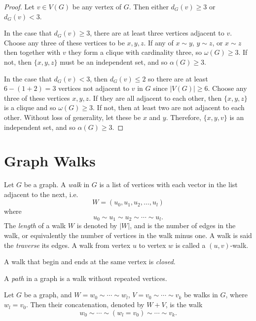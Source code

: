\begin{proof}
    Let $v \in V(G)$ be any vertex of $G$. Then either $d_G(v) \geq 3$ or $d_G(v) < 3$.

    In the case that $d_G(v) \geq 3$, there are at least three vertices adjacent to $v$. Choose any three of these vertices to be $x, y, z$. If any of $x \sim y$, $y \sim z$, or $x \sim z$ then together with $v$ they form a clique with cardinality three, so $\omega(G) \geq 3$. If not, then $\{x, y, z\}$ must be an independent set, and so $\alpha(G) \geq 3$.

    In the case that $d_G(v) < 3$, then $d_G(v) \leq 2$ so there are at least $6 - (1 + 2) = 3$ vertices not adjacent to $v$ in $G$ since $|V(G)| \geq 6$. Choose any three of these vertices $x, y, z$. If they are all adjacent to each other, then $\{x, y, z\}$ is a clique and so $\omega(G) \geq 3$. If not, then at least two are not adjacent to each other. Without loss of generality, let these be $x$ and $y$. Therefore, $\{x, y, v\}$ is an independent set, and so $\alpha(G) \geq 3$.
\end{proof}

\section{Graph Walks}

\begin{defn}
    Let $G$ be a graph. A \emph{walk} in $G$ is a list of vertices with each vector in the list adjacent to the next, i.e. \[W = (u_0, u_1, u_2, \ldots, u_l)\] where \[u_0 \sim u_1 \sim u_2 \sim \cdots \sim u_l.\] The \emph{length} of a walk $W$ is denoted by $|W|$, and is the number of edges in the walk, or equivalently the number of vertices in the walk minus one. A walk is said the \emph{traverse} its edges. A walk from vertex $u$ to vertex $w$ is called a $(u, v)$-walk.
\end{defn}

\begin{defn}
    A walk that begin and ends at the same vertex is \emph{closed}.
\end{defn}

\begin{defn}
    A \emph{path} in a graph is a walk without repeated vertices.
\end{defn}

\begin{defn}
    Let $G$ be a graph, and $W = w_0 \sim \cdots \sim w_l$, $V = v_0 \sim \cdots \sim v_k$ be walks in $G$, where $w_l = v_0$. Then their concatenation, denoted by $W + V$, is the walk \[w_0 \sim \cdots \sim (w_l = v_0) \sim \cdots \sim v_k.\]
\end{defn}


